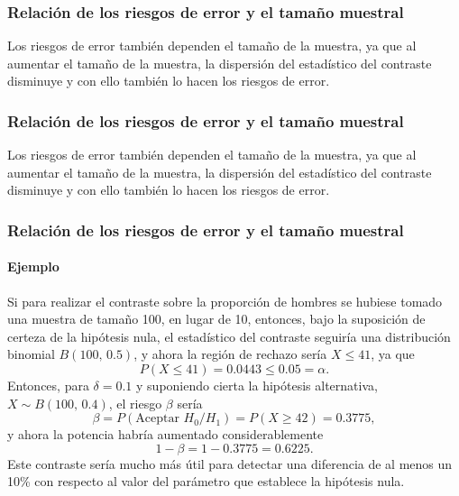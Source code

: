 \begin{frame}
\frametitle{Relación de los riesgos de error y el tamaño muestral}
Los riesgos de error también dependen el tamaño de la muestra, ya que al aumentar el tamaño de la muestra,
la dispersión del estadístico del contraste disminuye y con ello también lo hacen los riesgos de error. 
\begin{center}
\scalebox{0.7}{}
\end{center}
\end{frame}


\begin{frame}
\frametitle{Relación de los riesgos de error y el tamaño muestral}
Los riesgos de error también dependen el tamaño de la muestra, ya que al aumentar el tamaño de la muestra,
la dispersión del estadístico del contraste disminuye y con ello también lo hacen los riesgos de error. 
\begin{center}
\scalebox{0.7}{}
\end{center}
\end{frame}


\begin{frame}
\frametitle{Relación de los riesgos de error y el tamaño muestral}
\framesubtitle{Ejemplo}
Si para realizar el contraste sobre la proporción de hombres se hubiese tomado una muestra de tamaño 100, en lugar de
10, entonces, bajo la suposición de certeza de la hipótesis nula, el estadístico del contraste seguiría una
distribución binomial $B(100,\,0.5)$, y ahora la región de rechazo sería $X\leq 41$, ya que
\[
P(X\leq 41) = 0.0443 \leq 0.05 =\alpha.
\]
Entonces, para $\delta=0.1$ y suponiendo cierta la hipótesis alternativa, $X\sim B(100,\,0.4)$, el riesgo $\beta$ sería
\[
\beta = P(\text{Aceptar }H_0/H_1) = P(X\geq 42) = 0.3775,
\]
y ahora la potencia habría aumentado considerablemente 
\[
1-\beta = 1-0.3775 = 0.6225.
\]
Este contraste sería mucho más útil para detectar una diferencia de al menos un 10\% con respecto al valor del
parámetro que establece la hipótesis nula.
\end{frame}



